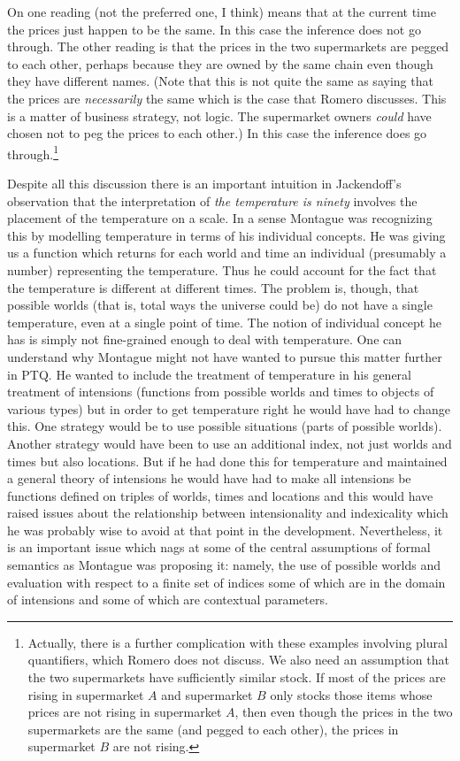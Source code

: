 On one reading (not the preferred one, I think)  means that
at the current time the prices just happen to be the same.  In this
case the inference does not go through.  The other reading is that the
prices in the two supermarkets are pegged to each other, perhaps
because they are owned by the same chain even though they have
different names.  (Note that this is not quite the same as saying that
the prices are \textit{necessarily} the same which is the case that
Romero discusses.  This is a matter of business strategy, not logic.
The supermarket owners \textit{could} have chosen not to peg the
prices to each other.)  In this case the inference does go
through.\footnote{Actually, there is a further complication with these
  examples involving plural quantifiers, which Romero does not
  discuss.  We also need an assumption that the two supermarkets have
  sufficiently similar stock.  If most of the prices are rising in
  supermarket $A$ and supermarket $B$ only stocks those items whose
  prices are not rising in supermarket $A$, then even though the
  prices in the two supermarkets are the same (and pegged to each
  other), the prices in supermarket $B$ are not rising.}  

Despite all this discussion there is an important intuition in
Jackendoff's observation that the interpretation of \textit{the
  temperature is ninety} involves the placement of the temperature on
a scale.  In a sense  Montague was recognizing this by modelling
temperature in terms of his individual concepts.  He was giving us a
function which returns for each world and time an individual
(presumably a number) representing the temperature.  Thus he could
account for the fact that the temperature is different at different
times.  The problem is, though, that possible worlds (that is, total
ways the universe could be) do not have a single temperature, even at
a single point of time.  The notion of individual concept he has is
simply not fine-grained enough to deal with temperature.  One can
understand why Montague might not have wanted to pursue this matter
further in PTQ.  He wanted to include the treatment of temperature in
his general treatment of intensions (functions from possible worlds
and times to objects of various types) but in order to get temperature
right he would have had to change this.  One strategy would be to use
possible situations (parts of possible worlds).  Another strategy
would have been to use an additional index, not just worlds and times
but also locations.  But if he had done this for temperature and
maintained a general theory of intensions he would
have had to make all intensions be functions defined on triples of worlds, times
and locations and this would have raised issues about the relationship
between intensionality and indexicality which he was probably wise to
avoid at that point in the development.  Nevertheless, it is an
important issue which nags at some of the central assumptions of 
formal semantics as Montague was proposing it: namely, the use of possible worlds and evaluation
with respect to a finite set of indices some of which are in the
domain of intensions and some of which are contextual parameters.

